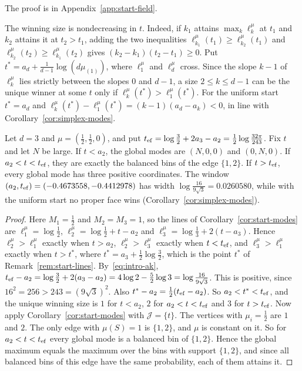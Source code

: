 The proof is in Appendix~\ref{app:start-field}.

\begin{remark}\label{rem:start-lines}
The winning size is nondecreasing in $t$. Indeed, if $k_1$ attains
$\max_k\ell^\mu_k$ at $t_1$ and $k_2$ attains it at $t_2>t_1$, adding the two
inequalities $\ell^\mu_{k_1}(t_1)\ge\ell^\mu_{k_2}(t_1)$ and
$\ell^\mu_{k_2}(t_2)\ge\ell^\mu_{k_1}(t_2)$ gives $(k_2-k_1)(t_2-t_1)\ge0$. Put
$t^*=a_d+\frac1{d-1}\log(d\mu_{(1)})$, where $\ell^\mu_1$ and $\ell^\mu_d$ cross.
Since the slope $k-1$ of $\ell^\mu_k$ lies strictly between the slopes $0$ and
$d-1$, a size $2\le k\le d-1$ can be the unique winner at some $t$ only if
$\ell^\mu_k(t^*)>\ell^\mu_1(t^*)$. For the uniform start $t^*=a_d$ and
$\ell^\mu_k(t^*)-\ell^\mu_1(t^*)=(k-1)(a_d-a_k)<0$, in line with
Corollary~\ref{cor:simplex-modes}.
\end{remark}

\begin{example}\label{ex:K3-start}
Let $d=3$ and $\mu=(\frac12,\frac12,0)$, and put
$t_{\rm ef}=\log\frac32+2a_3-a_2=\frac12\log\frac{32\pi}{243}$. Fix $t$ and let
$N$ be large. If $t<a_2$, the global modes are $(N,0,0)$ and $(0,N,0)$. If
$a_2<t<t_{\rm ef}$, they are exactly the balanced bins of the edge $\{1,2\}$. If
$t>t_{\rm ef}$, every global mode has three positive coordinates. The window
$(a_2,t_{\rm ef})=(-0.4673558,-0.4412978)$ has width
$\log\frac{16}{9\sqrt3}=0.0260580$, while with the uniform start no proper face
wins (Corollary~\ref{cor:simplex-modes}).
\end{example}

\begin{proof}
Here $M_1=\frac12$ and $M_2=M_3=1$, so the lines of
Corollary~\ref{cor:start-modes} are $\ell^\mu_1=\log\frac12$,
$\ell^\mu_2=\log\frac12+t-a_2$ and $\ell^\mu_3=\log\frac13+2(t-a_3)$. Hence
$\ell^\mu_2>\ell^\mu_1$ exactly when $t>a_2$, $\ell^\mu_2>\ell^\mu_3$ exactly
when $t<t_{\rm ef}$, and $\ell^\mu_3>\ell^\mu_1$ exactly when $t>t^*$, where
$t^*=a_3+\frac12\log\frac32$, which is the point $t^*$ of
Remark~\ref{rem:start-lines}. By~\eqref{eq:intro-ak},
$t_{\rm ef}-a_2=\log\frac32+2(a_3-a_2)=4\log2-\frac52\log3
=\log\frac{16}{9\sqrt3}$. This is positive, since
$16^2=256>243=(9\sqrt3)^2$. Also $t^*-a_2=\frac12(t_{\rm ef}-a_2)$. So
$a_2<t^*<t_{\rm ef}$, and the unique winning size is $1$ for $t<a_2$, $2$ for
$a_2<t<t_{\rm ef}$ and $3$ for $t>t_{\rm ef}$. Now apply
Corollary~\ref{cor:start-modes} with $\mathcal J=\{t\}$. The vertices with
$\mu_i=\frac12$ are $1$ and $2$. The only edge with $\mu(S)=1$ is $\{1,2\}$, and
$\mu$ is constant on it. So for $a_2<t<t_{\rm ef}$ every global mode is a
balanced bin of $\{1,2\}$. Hence the global maximum equals the maximum over the
bins with support $\{1,2\}$, and since all balanced bins of this edge have the
same probability, each of them attains it.
\end{proof}

